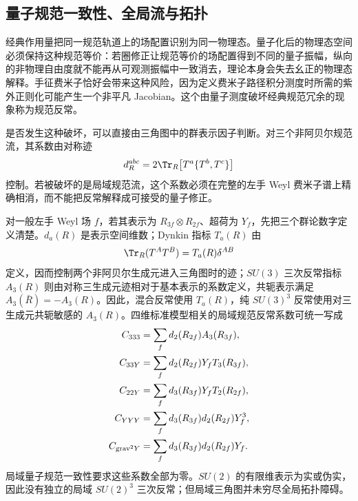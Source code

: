 \subsection{量子规范一致性、全局流与拓扑}\label{subsec:sm-gauge-anomaly-cancellation-dp32}

经典作用量把同一规范轨道上的场配置识别为同一物理态。量子化后的物理态空间必须保持这种规范等价：若圈修正让规范等价的场配置得到不同的量子振幅，纵向的非物理自由度就不能再从可观测振幅中一致消去，理论本身会失去幺正的物理态解释。手征费米子恰好会带来这种风险，因为定义费米子路径积分测度时所需的紫外正则化可能产生一个非平凡 Jacobian。这个由量子测度破坏经典规范冗余的现象称为规范反常。

\begin{definition}[手征规范反常的群论系数]
是否发生这种破坏，可以直接由三角图中的群表示因子判断。对三个非阿贝尔规范流，其系数由对称迹
\begin{equation*}
 d_R^{abc}=2\Tr_R\!\left[T^a\{T^b,T^c\}\right]
\end{equation*}
控制。若被破坏的是局域规范流，这个系数必须在完整的左手 Weyl 费米子谱上精确相消，而不能把反常解释成可接受的量子修正。

对一般左手 Weyl 场 $f$，若其表示为 $R_{3f}\otimes R_{2f}$、超荷为 $Y_f$，先把三个群论数字定义清楚。$d_a(R)$ 是表示空间维数；Dynkin 指标 $T_a(R)$ 由
\begin{equation*}
 \Tr_R(T^AT^B)=T_a(R)\delta^{AB}
\end{equation*}
定义，因而控制两个非阿贝尔生成元进入三角图时的迹；$SU(3)$ 三次反常指标 $A_3(R)$ 则由对称三生成元迹相对于基本表示的系数定义，共轭表示满足 $A_3(\bar R)=-A_3(R)$。因此，混合反常使用 $T_a(R)$，纯 $SU(3)^3$ 反常使用对三生成元共轭敏感的 $A_3(R)$。四维标准模型相关的局域规范反常系数可统一写成
\begin{equation}
{
\begin{aligned}
C_{333}&=\sum_f d_2(R_{2f})A_3(R_{3f}),\\
C_{33Y}&=\sum_f d_2(R_{2f})Y_fT_3(R_{3f}),\\
C_{22Y}&=\sum_f d_3(R_{3f})Y_fT_2(R_{2f}),\\
C_{YYY}&=\sum_f d_3(R_{3f})d_2(R_{2f})Y_f^3,\\
C_{{\rm grav}^2Y}&=\sum_f d_3(R_{3f})d_2(R_{2f})Y_f.
\end{aligned}}
\label{eq:general-chiral-anomaly-coefficients-dp75}
\end{equation}
局域量子规范一致性要求这些系数全部为零。$SU(2)$ 的有限维表示为实或伪实，因此没有独立的局域 $SU(2)^3$ 三次反常；但局域三角图并未穷尽全局拓扑障碍。
\end{definition}


